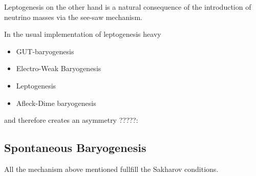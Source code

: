 \documentclass[13pt,a4paper,twoside,titlepage]{article}
\begin{document}
\noindent
Leptogenesis on the other hand is a natural consequence of the introduction of neutrino masses via the see-saw mechanism.

In the usual implementation of leptogenesis heavy


\begin{itemize}
    \item GUT-baryogenesis
    \item Electro-Weak Baryogenesis
    \item Leptogenesis
    \item Afleck-Dime baryogenesis
\end{itemize}

 and therefore creates an asymmetry ?????:

\subsection{Spontaneous Baryogenesis}
\label{sec:spontaneour_bayrogenesis}

All the mechanism above mentioned fullfill the Sakharov conditions.
\end{document}
